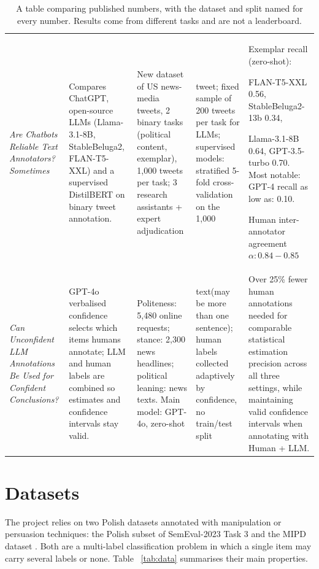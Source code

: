 \documentclass[11pt]{article}
\begin{document}
\begin{table}[t!]
\begin{tabular}{@{}P{0.19\textwidth} P{0.19\textwidth} P{0.13\textwidth} P{0.17\textwidth} P{0.25\textwidth}@{}}
\textit{Are Chatbots Reliable Text Annotators? Sometimes} \cite{are-chatbots-reliab} & Compares ChatGPT, open-source LLMs (Llama-3.1-8B, StableBeluga2, FLAN-T5-XXL) and a supervised DistilBERT on binary tweet annotation. & New dataset of US news-media tweets, 2 binary tasks (political content, exemplar), 1,000 tweets per task; 3 research assistants + expert adjudication & tweet; fixed sample of 200 tweets per task for LLMs; supervised models: stratified 5-fold cross-validation on the 1,000 &
Exemplar recall (zero-shot):

FLAN-T5-XXL 0.56, StableBeluga2-13b 0.34,

Llama-3.1-8B 0.64, GPT-3.5-turbo 0.70.
Most notable: GPT-4 recall as low as: 0.10.

Human inter-annotator agreement $\alpha:0.84-0.85$

\\


\textit{Can Unconfident LLM Annotations Be Used for Confident Conclusions?} \cite{can-uncofindent-lln} & GPT-4o verbalised confidence selects which items humans annotate; LLM and human labels are combined so estimates and confidence intervals stay valid. & Politeness: 5,480 online requests; stance: 2,300 news headlines; political leaning: news texts. Main model: GPT-4o, zero-shot& 
text(may be more than one sentence); human labels collected adaptively by confidence, no train/test split &
Over 25\% fewer human annotations needed for comparable statistical estimation precision across all three settings, while maintaining valid confidence intervals when annotating with Human + LLM.


\\


\bottomrule
\end{tabular}
\caption{A table comparing published numbers, with the dataset and split named for every number. Results come from different tasks and are not a leaderboard.}
\label{tab:annotation}
\end{table}

\section{Datasets}
The project relies on two Polish datasets annotated with manipulation or persuasion techniques: the Polish subset of SemEval-2023 Task 3 \cite{2023-semeval} and the MIPD dataset \cite{mipd-2024}. Both are a multi-label classification problem in which a single item may carry several labels or none. Table ~\ref{tab:data} summarises their main properties.
\end{document}
